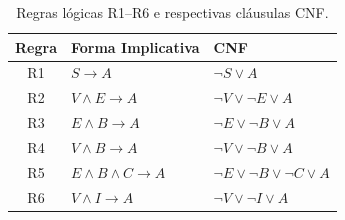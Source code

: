 
\begin{table}[H]
\centering
\caption{Regras lógicas R1--R6 e respectivas cláusulas CNF.}
\label{tab:regras}
\begin{tabular}{cll}
\toprule
\textbf{Regra} & \textbf{Forma Implicativa} & \textbf{CNF} \\
\midrule
R1 & $S \rightarrow A$              & $\neg S \lor A$ \\
R2 & $V \land E \rightarrow A$      & $\neg V \lor \neg E \lor A$ \\
R3 & $E \land B \rightarrow A$      & $\neg E \lor \neg B \lor A$ \\
R4 & $V \land B \rightarrow A$      & $\neg V \lor \neg B \lor A$ \\
R5 & $E \land B \land C \rightarrow A$ & $\neg E \lor \neg B \lor \neg C \lor A$ \\
R6 & $V \land I \rightarrow A$      & $\neg V \lor \neg I \lor A$ \\
\bottomrule
\end{tabular}
\end{table}
